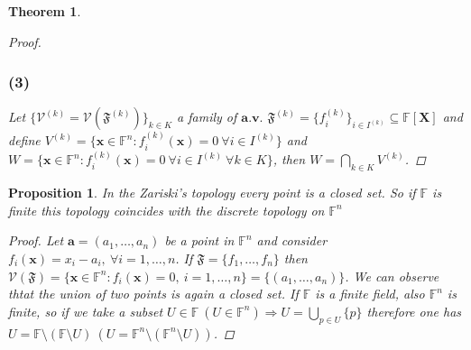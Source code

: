\documentclass{article}
\newtheorem{proposition}{Proposition}
\newtheorem{theorem}{Theorem}
\begin{document}
\begin{theorem}
\begin{proof}
                \subsubsection*{(3)}
                    Let $\{ \mathcal{V}^{(k)} = \mathcal{V}(\mathfrak{F}^{(k)}) \}_{k \in K}$ a family of $\textbf{a.v.}$ $\mathfrak{F}^{(k)} = \{ f_i^{(k)}\}_{i \in I^{(k)}} \subseteq \mathbb{F}[\textbf{X}]$ and define
                    $V^{(k)} = \{ \textbf{x} \in \mathbb{F}^n : f_i^{(k)}(\textbf{x}) = 0 \ \forall i \in I^{(k)}\}$ and  $W = \{ \textbf{x} \in \mathbb{F}^n : f_i^{(k)}(\textbf{x}) = 0 \ \forall i \in I^{(k)} \ \forall k \in K \}$, then $W = \bigcap_{k\in K} V^{(k)}$. 
            \end{proof} 
        \end{theorem}
        \begin{proposition}
            In the Zariski's topology every point is a closed set. So if $\mathbb{F}$ is finite this topology coincides with the discrete topology on $\mathbb{F}^n$
            \begin{proof}
                Let $\textbf{a} = (a_1,\dots,a_n)$ be a point in $\mathbb{F}^n $ and consider $f_i(\textbf{x}) = x_i - a_i, \ \forall i=1,\dots,n$. If $\mathfrak{F} = \{ f_1,\dots,f_n \}$ then $\mathcal{V}(\mathfrak{F}) = \{ \textbf{x} \in \mathbb{F}^n : f_i(\textbf{x}) = 0, \ i=1,\dots,n\} = \{ (a_1,\dots,a_n) \}$. We can observe thtat the union of two points is again a closed set.
                If $\mathbb{F}$ is a finite field, also $\mathbb{F}^n$ is finite, so if we take a subset $U \in \mathbb{F} \ (U \in \mathbb{F}^n) \Rightarrow U = \bigcup_{p \in U}\{ p\}$ therefore one has $U = \mathbb{F}\setminus (\mathbb{F}\setminus U) \ (U = \mathbb{F}^n\setminus (\mathbb{F}^n\setminus U))$.
            \end{proof}
        \end{proposition} 
        \newpage 
\end{document}
